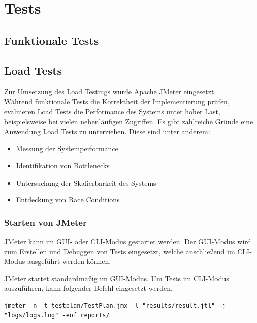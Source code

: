 \chapter{Tests}

\section{Funktionale Tests}\label{sec:tests-functional}



\clearpage
\section{Load Tests}\label{sec:tests-load}
Zur Umsetzung des Load Testings wurde Apache JMeter eingesetzt.\\

Während funktionale Tests die Korrektheit der Implementierung prüfen,
evaluieren Load Tests die Performance des Systems unter hoher Last,
beispielsweise bei vielen nebenläufigen Zugriffen.
Es gibt zahlreiche Gründe eine Anwendung Load Tests zu unterziehen.
Diese sind unter anderem:

\begin{itemize}
    \item Messung der Systemperformance
    \item Identifikation von Bottlenecks
    \item Untersuchung der Skalierbarkeit des Systems
    \item Entdeckung von Race Conditions
\end{itemize}

\subsection{Starten von JMeter}

JMeter kann im GUI- oder CLI-Modus gestartet werden.
Der GUI-Modus wird zum Erstellen und Debuggen von Tests eingesetzt,
welche anschließend im CLI-Modus ausgeführt werden können.

JMeter startet standardmäßig im GUI-Modus.
Um Tests im CLI-Modus auszuführen, kann folgender Befehl eingesetzt werden.

\begin{lstlisting}[caption=Beispielkonfiguration des CLI-Modus]
    jmeter -n -t testplan/TestPlan.jmx -l "results/result.jtl" -j "logs/logs.log" -eof reports/
\end{lstlisting}

